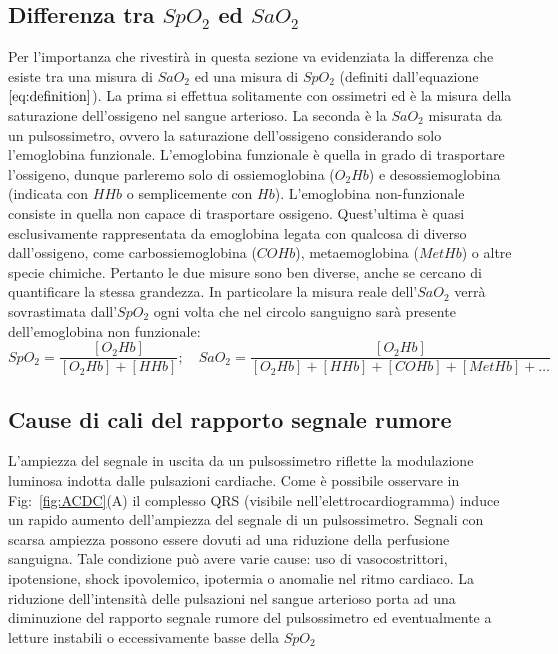 \documentclass[a4paper, 12pt]{book}
\begin{document}
\subsection{Differenza tra \texorpdfstring{$SpO_2$}{SpO_2} ed \texorpdfstring{$SaO_2$}{SaO_2}}

Per l'importanza che rivestirà in questa sezione va evidenziata la differenza che esiste tra una misura di $SaO_2$ ed una misura di $SpO_2$ (definiti dall'equazione~$\ref{eq:definition}$).
La prima si effettua solitamente con ossimetri ed è la misura della saturazione dell'ossigeno nel sangue arterioso.
La seconda è la $SaO_2$ misurata da un pulsossimetro, ovvero la saturazione dell'ossigeno considerando solo l'emoglobina funzionale.
L'emoglobina funzionale è quella in grado di trasportare l'ossigeno, dunque parleremo solo di ossiemoglobina ($O_2Hb$) e desossiemoglobina (indicata con $HHb$ o semplicemente con $Hb$).
L'emoglobina non-funzionale consiste in quella non capace di trasportare ossigeno.
Quest'ultima è quasi esclusivamente rappresentata da emoglobina legata con qualcosa di diverso dall'ossigeno, come carbossiemoglobina ($COHb$), metaemoglobina ($MetHb$) o altre specie chimiche.
Pertanto le due misure sono ben diverse, anche se cercano di quantificare la stessa grandezza.
In particolare la misura reale dell'$SaO_2$ verrà sovrastimata dall'$SpO_2$ ogni volta che nel circolo sanguigno sarà presente dell'emoglobina non funzionale:
\begin{equation}
	\label{eq:definition}
	SpO_2 = \frac{[O_2Hb]}{[O_2Hb]+[HHb]}; \quad SaO_2 = \frac{[O_2Hb]}{[O_2Hb]+[HHb]+			[COHb]+[MetHb]+\ldots}
\end{equation}


\subsection{Cause di cali del rapporto segnale rumore}

L'ampiezza del segnale in uscita da un pulsossimetro riflette la modulazione luminosa indotta dalle pulsazioni cardiache.
Come è possibile osservare in Fig:~\ref{fig:ACDC}(A) il complesso QRS (visibile nell'elettrocardiogramma) induce un rapido aumento dell'ampiezza del segnale di un pulsossimetro.
Segnali con scarsa ampiezza possono essere dovuti ad una riduzione della perfusione sanguigna. Tale condizione può avere varie cause: uso di vasocostrittori, ipotensione, shock ipovolemico, ipotermia o anomalie nel ritmo cardiaco.
La riduzione dell'intensità delle pulsazioni nel sangue arterioso porta ad una diminuzione del rapporto segnale rumore del pulsossimetro ed eventualmente a letture instabili o eccessivamente basse della $SpO_2$
\end{document}
